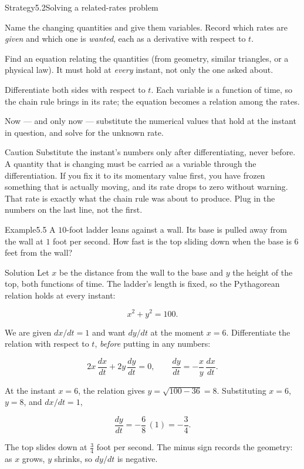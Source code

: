 \documentclass[a4paper,12pt,oneside]{memoir}
\begin{document}
\begin{envstrategy}{Strategy}{5.2}{Solving a related-rates problem}
\begin{steps}
  \item Name the changing quantities and give them variables. Record which rates are \emph{given} and which one is \emph{wanted}, each as a derivative with respect to \(t\).
  \item Find an equation relating the quantities (from geometry, similar triangles, or a physical law). It must hold at \emph{every} instant, not only the one asked about.
  \item Differentiate both sides with respect to \(t\). Each variable is a function of time, so the chain rule brings in its rate; the equation becomes a relation among the rates.
  \item Now — and only now — substitute the numerical values that hold at the instant in question, and solve for the unknown rate.
\end{steps}
\end{envstrategy}
\begin{envcaution}{Caution}{}{}
Substitute the instant’s numbers only after differentiating, never before. A quantity that is changing must be carried as a variable through the differentiation. If you fix it to its momentary value first, you have frozen something that is actually moving, and its rate drops to zero without warning. That rate is exactly what the chain rule was about to produce. Plug in the numbers on the last line, not the first.
\end{envcaution}
\begin{workedexample}
\begin{envexample}{Example}{5.5}{}
A \(10\)-foot ladder leans against a wall. Its base is pulled away from the wall at \(1\) foot per second. How fast is the top sliding down when the base is \(6\) feet from the wall?
\end{envexample}
\begin{envsolution}{Solution}{}{}
Let \(x\) be the distance from the wall to the base and \(y\) the height of the top, both functions of time. The ladder’s length is fixed, so the Pythagorean relation holds at every instant:

\[ x^{2} + y^{2} = 100. \]

We are given \(dx/dt = 1\) and want \(dy/dt\) at the moment \(x = 6\). Differentiate the relation with respect to \(t\), \emph{before} putting in any numbers:

\[ 2x\,\frac{dx}{dt} + 2y\,\frac{dy}{dt} = 0, \qquad \frac{dy}{dt} = -\frac{x}{y}\,\frac{dx}{dt}. \]

At the instant \(x = 6\), the relation gives \(y = \sqrt{100 - 36} = 8\). Substituting \(x = 6\), \(y = 8\), and \(dx/dt = 1\),

\[ \frac{dy}{dt} = -\frac{6}{8}\,(1) = -\frac{3}{4}. \]

The top slides down at \(\tfrac{3}{4}\) foot per second. The minus sign records the geometry: as \(x\) grows, \(y\) shrinks, so \(dy/dt\) is negative. \qedmark
\end{envsolution}
\end{workedexample}
\end{document}
